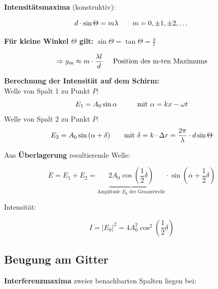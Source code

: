 \textbf{Intensitätsmaxima} (konstruktiv):

\begin{formulabox}
    \[
        d \cdot \sin{\Theta} = m\lambda \hspace{7mm} m = 0,  \pm 1, \pm 2, \dots
    \]
\end{formulabox}

\textbf{Für kleine Winkel $\Theta$ gilt:} $\sin{\Theta} = \tan{\Theta} = \frac{y}{l}$

\begin{formulabox}
    \[
        \Rightarrow y_m \approx m \cdot \frac{\lambda l}{d} \hspace{5mm} \text{Position des m-ten Maximums}
    \]
\end{formulabox}

\textbf{Berechnung der Intensität auf dem Schirm:} \\[1ex]

\hspace{3mm} Welle von Spalt 1 zu Punkt $P$:
\[
    E_1 = A_0 \sin{\alpha} \hspace{10mm} \text{mit } \alpha = kx - \omega t
\]
\hspace{3mm} Welle von Spalt 2 zu Punkt $P$:
\[
    E_2 = A_0 \sin{(\alpha + \delta)} \hspace{7mm} \text{mit } \delta = k \cdot \Delta r = \frac{2\pi}{\lambda} \cdot d \sin{\Theta}
\]

\hspace{3mm} Aus \textbf{Überlagerung} resultierende Welle:

\begin{formulabox}
    \[
        E = E_1 + E_2  = \underbrace{2 A_0 \cos{ \left(\frac{1}{2}\delta \right)}}_{\text{Amplitude $E_0$ der Gesamtwelle}} \cdot \sin{\left( \alpha + \frac{1}{2}\delta \right)}
    \]
\end{formulabox}

\hspace{3mm} Intensität:

\begin{formulabox}
    \[
        I = |E_0|^2 = 4 A_0^2 \cos^2{\left(\frac{1}{2}\delta \right)}
    \]
\end{formulabox}

\subsection{Beugung am Gitter}
\textbf{Interferenzmaxima} zweier benachbarten Spalten liegen bei:

